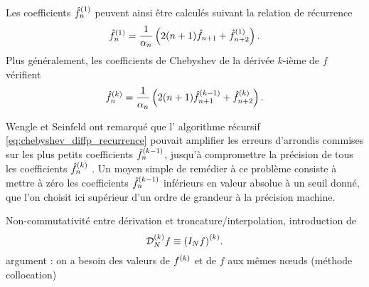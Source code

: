 Les coefficients ${\hat{f}}^{({1})}_n$ peuvent ainsi être calculés suivant la relation de récurrence
\begin{equation}
	\deriv{\hat{f}}{1}_n = 
	\frac{1}{\alpha_n} \left( 2 (n + 1) \hat{f}_{n+1} + \deriv{\hat{f}}{1}_{n+2} \right).
	\label{eq:chebyshev_diff_recurrence}
\end{equation}
Plus généralement, les coefficients de Chebyshev de la dérivée $k$-ième de $f$ vérifient
\begin{equation}
	\deriv{\hat{f}}{k}_n = 
	\frac{1}{\alpha_n} \left( 2 (n + 1) \deriv{\hat{f}}{k-1}_{n+1} + \deriv{\hat{f}}{k}_{n+2} \right).
	\label{eq:chebyshev_diffp_recurrence}
\end{equation}

Wengle et Seinfeld \cite{wengle1978} ont remarqué que l' algorithme récursif \eqref{eq:chebyshev_diffp_recurrence} pouvait amplifier les erreurs d'arrondis commises sur les plus petits coefficients ${\hat{f}}^{({k-1})}_{n}$, jusqu'à compromettre la précision de tous les coefficients ${\hat{f}}^{({k})}_{n}$ .
Un moyen simple de remédier à ce problème consiste à mettre à zéro les coefficients ${\hat{f}}^{({k-1})}_{n}$ inférieurs en valeur absolue à un seuil donné, que l'on choisit ici supérieur d'un ordre de grandeur à la précision machine.
\par\bigskip
Non-commutativité entre dérivation et troncature/interpolation, introduction de 
\begin{equation}
	\interpderiv{f}{N}{k} \equiv \deriv{ \left( \interpolant{f}{N} \right) }{k}.
	\label{eq:chebyshev_interpderiv}
\end{equation}
argument : on a besoin des valeurs de ${f}^{({k})}$ et de $f$ aux mêmes n\oe uds (méthode collocation)



